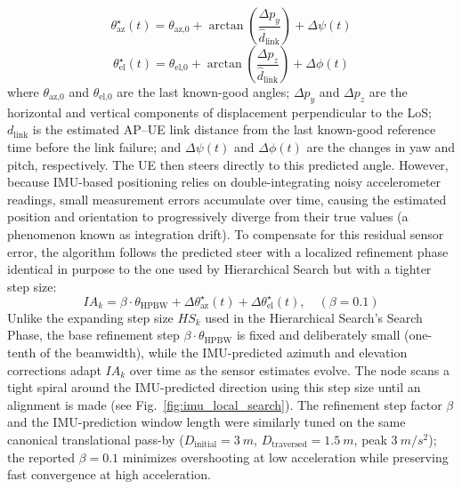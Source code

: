 \documentclass[fleqn,10pt]{wlscirep}
\newcommand{\rev}[1]{{\color{revblue}#1}}
\begin{document}
\begin{equation}
    \theta_{\text{az}}^{\star}(t) = \theta_{\text{az,0}} + \arctan\!\left(\frac{\Delta p_{y}}{\hat{d}_{\text{link}}}\right) + \Delta\psi(t)
\end{equation}
\begin{equation}
    \theta_{\text{el}}^{\star}(t) = \theta_{\text{el,0}} + \arctan\!\left(\frac{\Delta p_{z}}{\hat{d}_{\text{link}}}\right) + \Delta\phi(t)
\end{equation}
where $\theta_{\text{az,0}}$ and $\theta_{\text{el,0}}$ are the last known-good angles; $\Delta p_y$ and $\Delta p_z$ are the horizontal and vertical components of displacement perpendicular to the LoS; $d_{\text{link}}$ is the estimated AP--UE link distance from the last known-good reference time before the link failure; and $\Delta\psi(t)$ and $\Delta\phi(t)$ are the changes in yaw and pitch, respectively. The UE then steers directly to this predicted angle. However, because IMU-based positioning relies on double-integrating noisy accelerometer readings, small measurement errors accumulate over time, causing the estimated position and orientation to progressively diverge from their true values (a phenomenon known as integration drift). To compensate for this residual sensor error, the algorithm follows the predicted steer with a localized refinement phase identical in purpose to the one used by Hierarchical Search but with a tighter step size:
\begin{equation}
    IA_k = \beta \cdot \theta_{\text{HPBW}} + \Delta\theta_{\text{az}}^{\star}(t) + \Delta\theta_{\text{el}}^{\star}(t), \quad (\beta = 0.1)
\end{equation}
Unlike the expanding step size $HS_k$ used in the Hierarchical Search's Search Phase, the base refinement step $\beta \cdot \theta_{\text{HPBW}}$ is fixed and deliberately small (one-tenth of the beamwidth), while the IMU-predicted azimuth and elevation corrections adapt $IA_k$ over time as the sensor estimates evolve. The node scans a tight spiral around the IMU-predicted direction using this step size until an alignment is made (see Fig.~\ref{fig:imu_local_search}). \rev{The refinement step factor $\beta$ and the IMU-prediction window length were similarly tuned on the same canonical translational pass-by ($D_{\text{initial}} = \SI{3}{m}$, $D_{\text{traversed}} = \SI{1.5}{m}$, peak $\SI{3}{m/s^2}$); the reported $\beta = 0.1$ minimizes overshooting at low acceleration while preserving fast convergence at high acceleration.}

\end{document}
